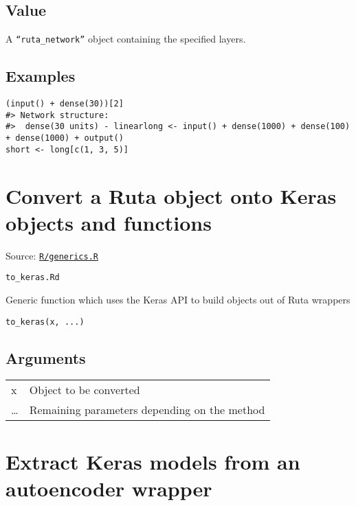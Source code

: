 \hypertarget{value}{\subsection{\texorpdfstring{\protect\hyperlink{value}{}Value}{Value}}\label{value}}

A \texttt{``ruta\_network''} object containing the specified layers.

\hypertarget{examples}{\subsection{\texorpdfstring{\protect\hyperlink{examples}{}Examples}{Examples}}\label{examples}}

\begin{verbatim}
(input() + dense(30))[2]
#> Network structure:
#>  dense(30 units) - linearlong <- input() + dense(1000) + dense(100) + dense(1000) + output()
short <- long[c(1, 3, 5)]
\end{verbatim}

\section{Convert a Ruta object onto Keras objects and
functions}\label{convert-a-ruta-object-onto-keras-objects-and-functions}

Source:
\href{https://github.com/fdavidcl/ruta/blob/master/R/generics.R}{\texttt{R/generics.R}}

\texttt{to\_keras.Rd}

Generic function which uses the Keras API to build objects out of Ruta
wrappers

\begin{verbatim}
to_keras(x, ...)
\end{verbatim}

\hypertarget{arguments}{\subsection{\texorpdfstring{\protect\hyperlink{arguments}{}Arguments}{Arguments}}\label{arguments}}

\begin{longtable}[c]{@{}>{\small}p{3cm}>{\raggedright}p{12.5cm}@{}}
\toprule
x & Object to be converted\tabularnewline
\ldots{} & Remaining parameters depending on the method\tabularnewline
\bottomrule
\end{longtable}

\section{Extract Keras models from an autoencoder
wrapper}\label{extract-keras-models-from-an-autoencoder-wrapper}

